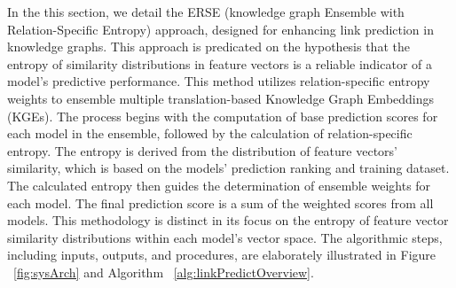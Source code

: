 \documentclass{article}
\begin{document}
In the this section, we detail the ERSE (knowledge graph Ensemble with Relation-Specific Entropy) approach, designed for enhancing link prediction in knowledge graphs. This approach is predicated on the hypothesis that the entropy of similarity distributions in feature vectors is a reliable indicator of a model's predictive performance. This method utilizes relation-specific entropy weights to ensemble multiple translation-based Knowledge Graph Embeddings (KGEs). The process begins with the computation of base prediction scores for each model in the ensemble, followed by the calculation of relation-specific entropy. The entropy is derived from the distribution of feature vectors' similarity, which is based on the models' prediction ranking and training dataset. The calculated entropy then guides the determination of ensemble weights for each model. The final prediction score is a sum of the weighted scores from all models. This methodology is distinct in its focus on the entropy of feature vector similarity distributions within each model's vector space. The algorithmic steps, including inputs, outputs, and procedures, are elaborately illustrated in Figure ~\ref{fig:sysArch} and Algorithm ~\ref{alg:linkPredictOverview}. 
\end{document}
